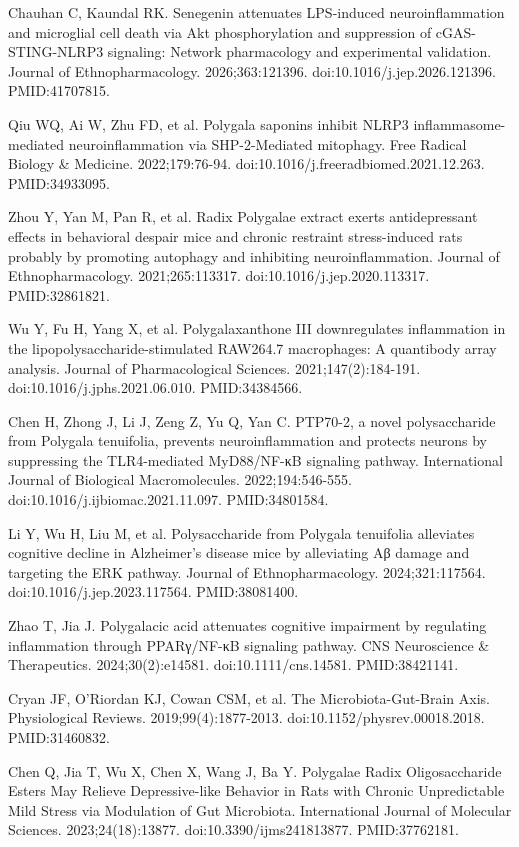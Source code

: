 \documentclass[12pt,oneside]{book}
\newcommand{\reff}[2]{\par\hangindent=7mm\hangafter=1\noindent[#1]\hspace{2mm}#2\par}
\begin{document}
\reff{13}{Chauhan C, Kaundal RK. Senegenin attenuates LPS-induced neuroinflammation and microglial cell death via Akt phosphorylation and suppression of cGAS-STING-NLRP3 signaling: Network pharmacology and experimental validation. Journal of Ethnopharmacology. 2026;363:121396. doi:10.1016/j.jep.2026.121396. PMID:41707815.}

\reff{14}{Qiu WQ, Ai W, Zhu FD, et al. Polygala saponins inhibit NLRP3 inflammasome-mediated neuroinflammation via SHP-2-Mediated mitophagy. Free Radical Biology \& Medicine. 2022;179:76-94. doi:10.1016/j.freeradbiomed.2021.12.263. PMID:34933095.}

\reff{15}{Zhou Y, Yan M, Pan R, et al. Radix Polygalae extract exerts antidepressant effects in behavioral despair mice and chronic restraint stress-induced rats probably by promoting autophagy and inhibiting neuroinflammation. Journal of Ethnopharmacology. 2021;265:113317. doi:10.1016/j.jep.2020.113317. PMID:32861821.}

\reff{16}{Wu Y, Fu H, Yang X, et al. Polygalaxanthone III downregulates inflammation in the lipopolysaccharide-stimulated RAW264.7 macrophages: A quantibody array analysis. Journal of Pharmacological Sciences. 2021;147(2):184-191. doi:10.1016/j.jphs.2021.06.010. PMID:34384566.}

\reff{17}{Chen H, Zhong J, Li J, Zeng Z, Yu Q, Yan C. PTP70-2, a novel polysaccharide from Polygala tenuifolia, prevents neuroinflammation and protects neurons by suppressing the TLR4-mediated MyD88/NF-κB signaling pathway. International Journal of Biological Macromolecules. 2022;194:546-555. doi:10.1016/j.ijbiomac.2021.11.097. PMID:34801584.}

\reff{18}{Li Y, Wu H, Liu M, et al. Polysaccharide from Polygala tenuifolia alleviates cognitive decline in Alzheimer's disease mice by alleviating Aβ damage and targeting the ERK pathway. Journal of Ethnopharmacology. 2024;321:117564. doi:10.1016/j.jep.2023.117564. PMID:38081400.}

\reff{19}{Zhao T, Jia J. Polygalacic acid attenuates cognitive impairment by regulating inflammation through PPARγ/NF-κB signaling pathway. CNS Neuroscience \& Therapeutics. 2024;30(2):e14581. doi:10.1111/cns.14581. PMID:38421141.}

\reff{20}{Cryan JF, O'Riordan KJ, Cowan CSM, et al. The Microbiota-Gut-Brain Axis. Physiological Reviews. 2019;99(4):1877-2013. doi:10.1152/physrev.00018.2018. PMID:31460832.}

\reff{21}{Chen Q, Jia T, Wu X, Chen X, Wang J, Ba Y. Polygalae Radix Oligosaccharide Esters May Relieve Depressive-like Behavior in Rats with Chronic Unpredictable Mild Stress via Modulation of Gut Microbiota. International Journal of Molecular Sciences. 2023;24(18):13877. doi:10.3390/ijms241813877. PMID:37762181.}
\end{document}
